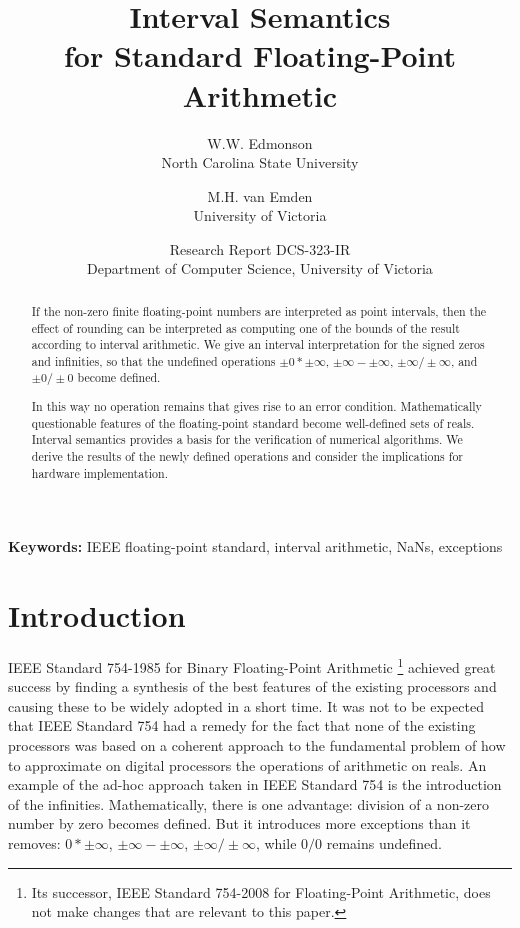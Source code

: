 \documentclass[11pt]{article}
\begin{document}
\title{Interval Semantics\\for Standard Floating-Point Arithmetic}


\date{}

\author{W.W. Edmonson \\ North Carolina State University
        \and
        M.H. van Emden \\ University of Victoria
}
\date{\small{
        Research Report DCS-323-IR \\
        Department of Computer Science, University of Victoria
      }
}

\maketitle

\begin{abstract}
If the non-zero finite floating-point numbers are interpreted as point
intervals, then the effect of rounding can be interpreted as computing
one of the bounds of the result according to interval arithmetic.
We give an interval interpretation for the signed zeros and infinities,
so that the undefined operations $\pm 0 * \pm \infty$,
$\pm \infty - \pm \infty$, 
$\pm \infty / \pm \infty$, 
and
$\pm 0 / \pm 0$
become defined.

In this way no operation remains that gives rise to an error
condition.
Mathematically questionable features of the floating-point standard
become well-defined sets of reals.
Interval semantics provides a basis for the verification of
numerical algorithms.
We derive the results of the newly defined operations
and consider the implications for hardware implementation.


\end{abstract}

{\bf Keywords:} IEEE floating-point standard, interval arithmetic, 
NaNs, exceptions

\section{Introduction}
IEEE Standard 754-1985 for Binary Floating-Point Arithmetic
\cite{Std754}\footnote{Its successor, IEEE Standard 754-2008 for
  Floating-Point Arithmetic\cite{Std754R}, does not make changes that are
  relevant to this paper.} achieved great success by finding a
synthesis of the best features of the existing processors and causing
these to be widely adopted in a short time.  It was not to be expected
that IEEE Standard 754 had a remedy for the fact that none of the
existing processors was based on a coherent approach to the
fundamental problem of how to approximate on digital processors the
operations of arithmetic on reals.  An example of the ad-hoc approach
taken in IEEE Standard 754 is the introduction of the infinities.
Mathematically, there is one advantage: division of a non-zero number
by zero becomes defined.  But it introduces more exceptions than it
removes: $0 * \pm \infty$, $\pm \infty - \pm \infty$, $\pm \infty /
\pm \infty$, while $0/0$ remains undefined.
\end{document}
